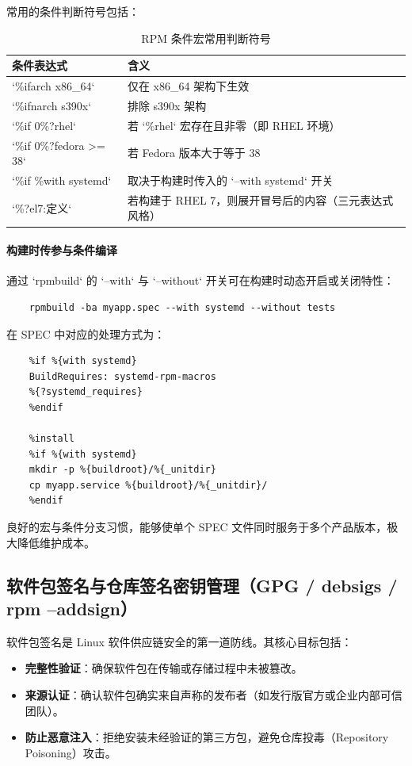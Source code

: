 \documentclass[12pt,UTF8]{ctexbook}
\begin{document}
常用的条件判断符号包括：
\begin{table}[htbp]
	\centering
	\caption{RPM 条件宏常用判断符号}
	\begin{tabular}{@{}ll@{}}
		\toprule
		\textbf{条件表达式} & \textbf{含义} \\
		\midrule
		`\%ifarch x86\_64` & 仅在 x86\_64 架构下生效 \\
		`\%ifnarch s390x` & 排除 s390x 架构 \\
		`\%if 0\%{?rhel}` & 若 `\%rhel` 宏存在且非零（即 RHEL 环境） \\
		`\%if 0\%{?fedora} >= 38` & 若 Fedora 版本大于等于 38 \\
		`\%if \%{with systemd}` & 取决于构建时传入的 `--with systemd` 开关 \\
		`\%{?el7:定义}` & 若构建于 RHEL 7，则展开冒号后的内容（三元表达式风格） \\
		\bottomrule
	\end{tabular}
\end{table}

\paragraph{构建时传参与条件编译}
通过 `rpmbuild` 的 `--with` 与 `--without` 开关可在构建时动态开启或关闭特性：
\begin{verbatim}
	rpmbuild -ba myapp.spec --with systemd --without tests
\end{verbatim}
在 SPEC 中对应的处理方式为：
\begin{verbatim}
	%if %{with systemd}
	BuildRequires: systemd-rpm-macros
	%{?systemd_requires}
	%endif
	
	%install
	%if %{with systemd}
	mkdir -p %{buildroot}/%{_unitdir}
	cp myapp.service %{buildroot}/%{_unitdir}/
	%endif
\end{verbatim}

良好的宏与条件分支习惯，能够使单个 SPEC 文件同时服务于多个产品版本，极大降低维护成本。

\subsection{软件包签名与仓库签名密钥管理（GPG / debsigs / rpm --addsign）}

软件包签名是 Linux 软件供应链安全的第一道防线。其核心目标包括：
\begin{itemize}
	\item \textbf{完整性验证}：确保软件包在传输或存储过程中未被篡改。
	\item \textbf{来源认证}：确认软件包确实来自声称的发布者（如发行版官方或企业内部可信团队）。
	\item \textbf{防止恶意注入}：拒绝安装未经验证的第三方包，避免仓库投毒（Repository Poisoning）攻击。
\end{itemize}
\end{document}
